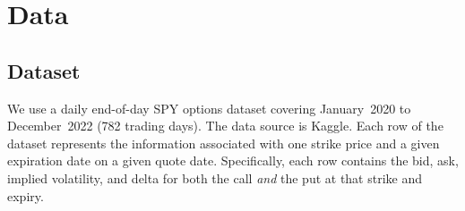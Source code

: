 \documentclass[10pt,twocolumn,a4paper]{article}
\theoremstyle{mydef}
\begin{document}

\setcounter{page}{1}

\section{Data}
\label{sec:data}

\subsection{Dataset}

We use a daily end-of-day SPY options dataset covering January~2020 to
December~2022 (782 trading days). The data source is Kaggle. Each row
of the dataset represents the information associated with one strike
price and a given expiration date on a given quote date. Specifically,
each row contains the bid, ask, implied volatility, and delta for both
the call \emph{and} the put at that strike and expiry.
\end{document}
